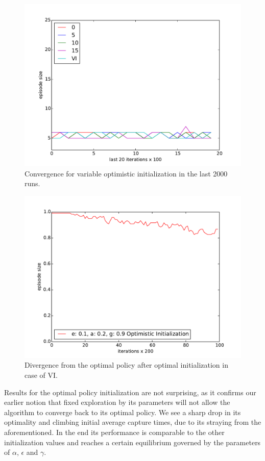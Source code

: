 \documentclass[paper=a4, fontsize=11pt]{scrartcl}
\numberwithin{equation}{section}		%
\numberwithin{figure}{section}			%
\numberwithin{table}{section}				%
\begin{document}
\begin{figure}[H] \centering
\includegraphics[scale=0.5]{optiInitlast20x100.pdf}
\caption{Convergence for variable optimistic initialization in the last 2000 runs.} 
\label{figure:optimisticlast20}
\end{figure}
\begin{figure}[H] \centering
\includegraphics[scale=0.6]{optimalityOptimistic.pdf}
\caption{Divergence from the optimal policy after optimal initialization in case of VI.} 
\label{figure:optiOpti}
\end{figure}
Results for the optimal policy initialization are not surprising, as it confirms our earlier notion that fixed exploration by its parameters will not allow the algorithm to converge back to its optimal policy. We see a sharp drop in its optimality and climbing initial average capture times, due to its straying from the aforementioned. In the end its performance is comparable to the other initialization values and reaches a certain equilibrium governed by the parameters of $\alpha$, $\epsilon$ and $\gamma$. \\
\end{document}
